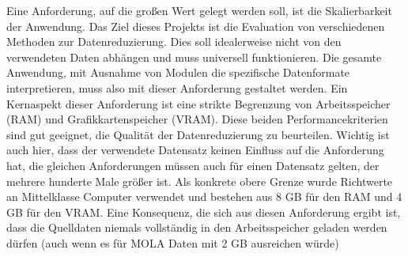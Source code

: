 Eine Anforderung, auf die großen Wert gelegt werden soll, ist die Skalierbarkeit der Anwendung. Das Ziel dieses Projekts ist die Evaluation von verschiedenen Methoden zur Datenreduzierung. Dies soll idealerweise nicht von den verwendeten Daten abhängen und muss universell funktionieren. Die gesamte Anwendung, mit Ausnahme von Modulen die spezifische Datenformate interpretieren, muss also mit dieser Anforderung gestaltet werden. Ein Kernaspekt dieser Anforderung ist eine strikte Begrenzung von Arbeitsspeicher (RAM) und Grafikkartenspeicher (VRAM). Diese beiden Performancekriterien sind gut geeignet, die Qualität der Datenreduzierung zu beurteilen. Wichtig ist auch hier, dass der verwendete Datensatz keinen Einfluss auf die Anforderung hat, die gleichen Anforderungen müssen auch für einen Datensatz gelten, der mehrere hunderte Male größer ist. Als konkrete obere Grenze wurde Richtwerte an Mittelklasse Computer verwendet und bestehen aus 8 GB für den RAM und 4 GB für den VRAM. Eine Konsequenz, die sich aus diesen Anforderung ergibt ist, dass die Quelldaten niemals vollständig in den Arbeitsspeicher geladen werden dürfen (auch wenn es für MOLA Daten mit 2 GB ausreichen würde)
